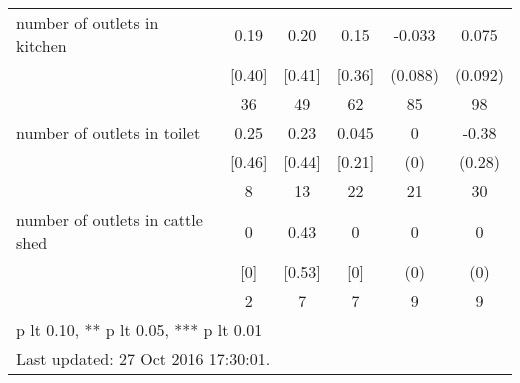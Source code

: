 \begin{table}[htbp]
\begin{tabular*}{0.9\hsize}{@{\hskip\tabcolsep\extracolsep\fill}l*{1}{ccccc}}
number of outlets in kitchen    &     0.19&     0.20&     0.15&   -0.033         &    0.075         \\
                                &   [0.40]&   [0.41]&   [0.36]&  (0.088)         &  (0.092)         \\
                                &       36&       49&       62&       85         &       98         \\
number of outlets in toilet     &     0.25&     0.23&    0.045&        0         &    -0.38         \\
                                &   [0.46]&   [0.44]&   [0.21]&      (0)         &   (0.28)         \\
                                &        8&       13&       22&       21         &       30         \\
number of outlets in cattle shed&        0&     0.43&        0&        0         &        0         \\
                                &      [0]&   [0.53]&      [0]&      (0)         &      (0)         \\
                                &        2&        7&        7&        9         &        9         \\
\bottomrule
\multicolumn{6}{l}{\footnotesize * p lt 0.10, ** p lt 0.05, *** p lt 0.01}\\
\multicolumn{6}{l}{\footnotesize Last updated: 27 Oct 2016 17:30:01.}\\
\end{tabular*}
\end{table}
